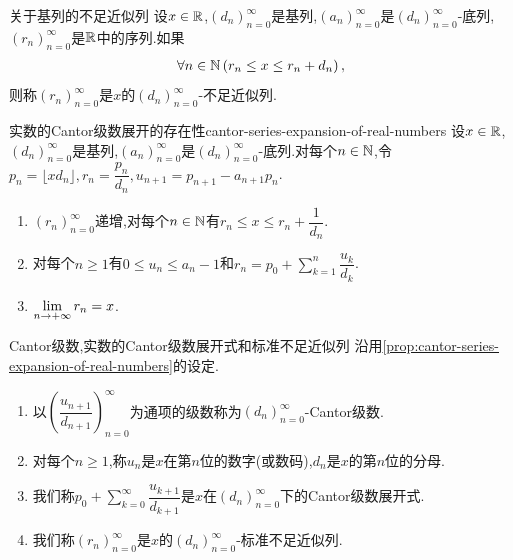\begin{definition}{关于基列的不足近似列}{}
	设$x\in\mathbb{R}$,$\left(d_{n}\right)_{n=0}^{\infty}$是基列,$\left(a_{n}\right)_{n=0}^{\infty}$是$\left(d_{n}\right)_{n=0}^{\infty}$-底列,$\left(r_{n}\right)_{n=0}^{\infty}$是$\mathbb{R}$中的序列.如果
	\begin{align*}
		\forall n\in\mathbb{N}\left(r_{n}\leq x\leq r_{n}+d_{n}\right),
	\end{align*}
	则称$\left(r_{n}\right)_{n=0}^{\infty}$是$x$的$\left(d_{n}\right)_{n=0}^{\infty}$-不足近似列.
\end{definition}

\begin{proposition}{实数的Cantor级数展开的存在性}{cantor-series-expansion-of-real-numbers}
	设$x\in\mathbb{R}$,$\left(d_{n}\right)_{n=0}^{\infty}$是基列,$\left(a_{n}\right)_{n=0}^{\infty}$是$\left(d_{n}\right)_{n=0}^{\infty}$-底列.对每个$n\in\mathbb{N}$,令$p_{n}=\lfloor xd_{n}\rfloor,r_{n}=\dfrac{p_{n}}{d_{n}},u_{n+1}=p_{n+1}-a_{n+1}p_{n}$.
	\begin{enumerate}
		\item $\left(r_{n}\right)_{n=0}^{\infty}$递增,对每个$n\in\mathbb{N}$有$r_{n}\leq x\leq r_{n}+\dfrac{1}{d_{n}}$.
		\item 对每个$n\geq 1$有$0\leq u_{n}\leq a_{n}-1$和$r_{n}=p_{0}+\sum\limits_{k=1}^{n}\dfrac{u_{k}}{d_{k}}$.
		\item $\displaystyle\lim_{n\to +\infty}r_{n}=x$.
	\end{enumerate}
\end{proposition}

\begin{definition}{Cantor级数,实数的Cantor级数展开式和标准不足近似列}{}
	沿用\cref{prop:cantor-series-expansion-of-real-numbers}的设定.
	\begin{enumerate}
		\item 以$\left(\dfrac{u_{n+1}}{d_{n+1}}\right)_{n=0}^{\infty}$为通项的级数称为$\left(d_{n}\right)_{n=0}^{\infty}$-Cantor级数.
		\item 对每个$n\geq 1$,称$u_{n}$是$x$在第$n$位的数字(或数码),$d_{n}$是$x$的第$n$位的分母.
		\item 我们称$p_{0}+\sum\limits_{k=0}^{\infty}\dfrac{u_{k+1}}{d_{k+1}}$是$x$在$\left(d_{n}\right)_{n=0}^{\infty}$下的Cantor级数展开式.
		\item 我们称$\left(r_{n}\right)_{n=0}^{\infty}$是$x$的$\left(d_{n}\right)_{n=0}^{\infty}$-标准不足近似列.
	\end{enumerate}
\end{definition}